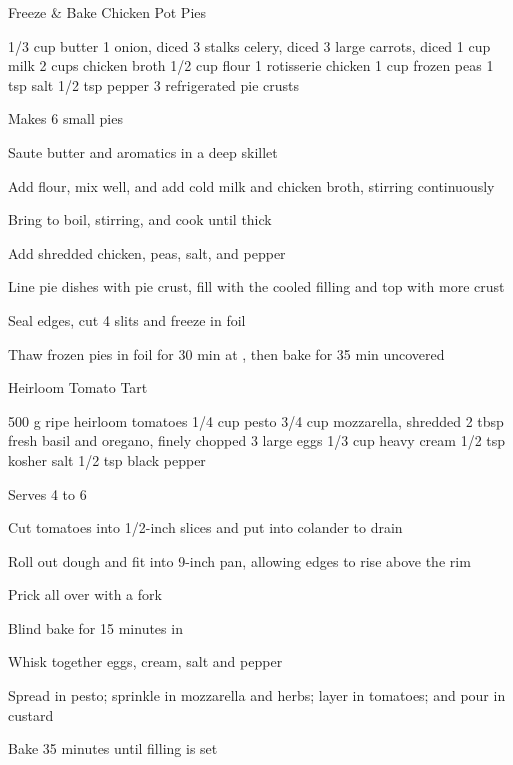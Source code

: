 
\begin{denserecipe}{Freeze \& Bake Chicken Pot Pies}{}
\begin{ingredients}
1/3 cup butter
1 onion, diced
3 stalks celery, diced
3 large carrots, diced
1 cup milk
2 cups chicken broth
1/2 cup flour
1 rotisserie chicken
1 cup frozen peas
1 tsp salt
1/2 tsp pepper
3 refrigerated pie crusts
\end{ingredients}
\nextcolumn
Makes 6 small pies
\begin{steps}
    \item Saute butter and aromatics in a deep skillet
    \item Add flour, mix well, and add cold milk and chicken broth, stirring continuously
    \item Bring to boil, stirring, and cook until thick
    \item Add shredded chicken, peas, salt, and pepper
    \item Line pie dishes with pie crust, fill with the cooled filling and top with more crust
    \item Seal edges, cut 4 slits and freeze in foil
    \item Thaw frozen pies in foil for 30 min at , then bake for 35 min uncovered
\end{steps}
\end{denserecipe}

\begin{denserecipe}{Heirloom Tomato Tart}{}
\begin{ingredients}
500 g ripe heirloom tomatoes
1/4 cup pesto
3/4 cup mozzarella, \ibreak shredded
2 tbsp fresh basil and oregano, finely chopped
3 large eggs
1/3 cup heavy cream
1/2 tsp kosher salt
1/2 tsp black pepper
\end{ingredients}
\nextcolumn
Serves 4 to 6
\begin{steps}
    \item Cut tomatoes into 1/2-inch slices and put into colander to drain
    \item Roll out dough and fit into 9-inch pan, allowing edges to rise above the rim
    \item Prick all over with a fork
    \item Blind bake for 15 minutes in 
    \item Whisk together eggs, cream, salt and pepper
    \item Spread in pesto; sprinkle in mozzarella and herbs; layer in tomatoes; and pour in custard
    \item Bake 35 minutes until filling is set
\end{steps}
\end{denserecipe}

